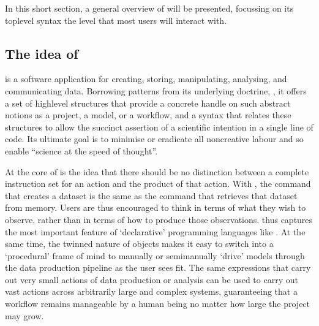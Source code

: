 \documentclass[letterpaper,10pt,english]{jupyterBook}
\begin{document}
\sphinxAtStartPar
In this short section, a general overview of  will be presented, focussing on its top\sphinxhyphen{}level syntax \sphinxhyphen{} the level that most users will interact with.


\subsection{The idea of }
\label{\detokenize{content/chapter_03_everest/framework:the-idea-of-everest}}
\sphinxAtStartPar
{} is a software application for creating, storing, manipulating, analysing, and communicating data. Borrowing patterns from its underlying doctrine, , it offers a set of high\sphinxhyphen{}level structures that provide a concrete handle on such abstract notions as a project, a model, or a workflow, and a syntax that relates these structures to allow the succinct assertion of a scientific intention in a single line of code. Its ultimate goal is to minimise or eradicate all non\sphinxhyphen{}creative labour and so enable “science at the speed of thought”.

\sphinxAtStartPar
At the core of  is the idea that there should be no distinction between a complete instruction set for an action and the product of that action. With , the command that creates a dataset is the same as the command that retrieves that dataset from memory. Users are thus encouraged to think in terms of what they wish to observe, rather than in terms of how to produce those observations.  thus captures the most important feature of ‘declarative’ programming languages like . At the same time, the twinned nature of  objects makes it easy to switch into a ‘procedural’ frame of mind to manually or semi\sphinxhyphen{}manually ‘drive’ models through the data production pipeline as the user sees fit. The same expressions that carry out very small actions of data production or analysis can be used to carry out vast actions across arbitrarily large and complex systems, guaranteeing that a workflow remains manageable by a human being no matter how large the project may grow.
\end{document}
